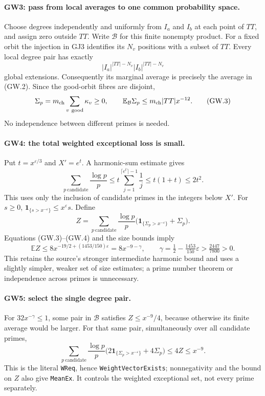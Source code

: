 \paragraph{GW3: pass from local averages to one common probability space.}
Choose degrees independently and uniformly from $I_a$ and $I_b$ at
each point of $TT$, and assign zero outside $TT$. Write $\mathcal B$
for this finite nonempty product. For a fixed orbit the injection in
GJ3 identifies its $N_v$ positions with a subset of $TT$. Every local
degree pair has exactly
\[
 |I_a|^{|TT|-N_v}|I_b|^{|TT|-N_v}
\]
global extensions. Consequently its marginal average is precisely
the average in (GW.2). Since the good-orbit fibres are disjoint,
\[
 \Sigma_p=m_{\rm ch}\sum_{v\ \mathrm{good}}\kappa_v\ge0,
 \qquad
 \mathbb E_{\mathcal B}\Sigma_p
 \le m_{\rm ch}|TT|x^{-12}.                         \tag{GW.3}
\]
No independence between different primes is needed.

\paragraph{GW4: the total weighted exceptional loss is small.}
Put $t=x^{\varepsilon/3}$ and $X'=e^t$. A harmonic-sum estimate gives
\[
 \sum_{p\ \mathrm{candidate}}\frac{\log p}{p}
 \le t\sum_{j=1}^{\lceil e^t\rceil-1}\frac1j
 \le t(1+t)\le2t^2.                                \tag{GW.4}
\]
This uses only the inclusion of candidate primes in the integers
below $X'$. For $s\ge0$,
$\mathbf1_{\{s>x^{-\varepsilon}\}}\le x^\varepsilon s$.
Define
\[
 Z=\sum_{p\ \mathrm{candidate}}\frac{\log p}{p}
   \bigl(\mathbf1_{\{\Sigma_p>x^{-\varepsilon}\}}+\Sigma_p\bigr).
\]
Equations (GW.3)--(GW.4) and the size bounds imply
\[
 \mathbb E Z
 \le8x^{-19/2+(1453/150)\varepsilon}
 =8x^{-9-\gamma},\qquad
 \gamma=\tfrac12-\tfrac{1453}{150}\varepsilon
 >\tfrac{2447}{7800}>0.                            \tag{GW.5}
\]
This retains the source's stronger intermediate harmonic bound and
uses a slightly simpler, weaker set of size estimates; a prime number
theorem or independence across primes is unnecessary.

\paragraph{GW5: select the single degree pair.}
For $32x^{-\gamma}\le1$, some pair in $\mathcal B$ satisfies
$Z\le x^{-9}/4$, because otherwise its finite average would be larger.
For that same pair, simultaneously over all candidate primes,
\[
 \boxed{\quad
 \sum_{p\ \mathrm{candidate}}\frac{\log p}{p}
  \bigl(2\mathbf1_{\{\Sigma_p>x^{-\varepsilon}\}}+4\Sigma_p\bigr)
 \le4Z\le x^{-9}.
 \quad}                                                   \tag{GW.6}
\]
This is the literal \texttt{WReq}, hence \texttt{WeightVectorExists};
nonnegativity and the bound on $Z$ also give \texttt{MeanEx}.
It controls the weighted exceptional set, not every prime separately.

